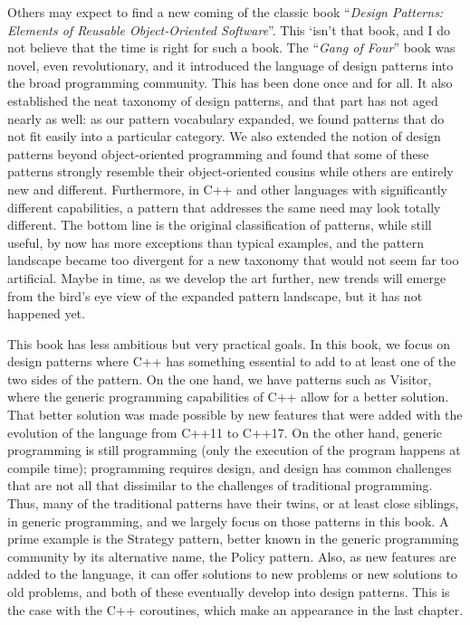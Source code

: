 Others may expect to find a new coming of the classic book ``\emph{Design Patterns: Elements of Reusable Object-Oriented Software}''. This `isn't that book, and I do not believe that the time is right for such a book. The ``\emph{Gang of Four}'' book was novel, even revolutionary, and it introduced the language of design patterns into the broad programming community. This has been done once and for all. It also established the neat taxonomy of design patterns, and that part has not aged nearly as well: as our pattern vocabulary expanded, we found patterns that do not fit easily into a particular category. We also extended the notion of design patterns beyond object-oriented programming and found that some of these patterns strongly resemble their object-oriented cousins while others are entirely new and different. Furthermore, in C++ and other languages with significantly different capabilities, a pattern that addresses the same need may look totally different. The bottom line is the original classification of patterns, while still useful, by now has more exceptions than typical examples, and the pattern landscape became too divergent for a new taxonomy that would not seem far too artificial. Maybe in time, as we develop the art further, new trends will emerge from the bird's eye view of the expanded pattern landscape, but it has not happened yet.

This book has less ambitious but very practical goals. In this book, we focus on design patterns where C++ has something essential to add to at least one of the two sides of the pattern. On the one hand, we have patterns such as Visitor, where the generic programming capabilities of C++ allow for a better solution. That better solution was made possible by new features that were added with the evolution of the language from C++11 to C++17. On the other hand, generic programming is still programming (only the execution of the program happens at compile time); programming requires design, and design has common challenges that are not all that dissimilar to the challenges of traditional programming. Thus, many of the traditional patterns have their twins, or at least close siblings, in generic programming, and we largely focus on those patterns in this book. A prime example is the Strategy pattern, better known in the generic programming community by its alternative name, the Policy pattern. Also, as new features are added to the language, it can offer solutions to new problems or new solutions to old problems, and both of these eventually develop into design patterns. This is the case with the C++ coroutines, which make an appearance in the last chapter.

